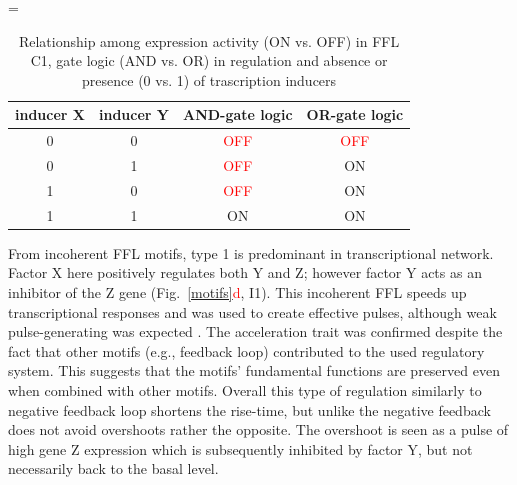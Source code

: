
\begin{center}
\LTcapwidth=\textwidth
    \begin{longtable}[c]{|c|c|c|c|}
\caption{Relationship among expression activity (ON vs. OFF) in FFL C1, gate logic (AND vs. OR) in regulation and absence or presence (0 vs. 1) of trascription inducers} \label{ANDvsOR} \\

\toprule \multicolumn{1}{|c|}{\textbf{inducer X}} & \multicolumn{1}{c|}{\textbf{inducer Y}}  & \multicolumn{1}{c|}{\textbf{AND-gate logic}} & \multicolumn{1}{c|}{\textbf{OR-gate logic}} \\
\midrule
\endhead

\bottomrule
\endlastfoot

0 & 0 & \textcolor{red}{OFF} & \textcolor{red}{OFF} \\
\hline
0 & 1 & \textcolor{red}{OFF} & \textcolor{mygreen}{ON} \\
\hline
1 & 0 & \textcolor{red}{OFF} & \textcolor{mygreen}{ON} \\
\hline
1 & 1 & \textcolor{mygreen}{ON} & \textcolor{mygreen}{ON} \\
    \end{longtable}
\end{center}


From incoherent FFL motifs, type 1 is predominant in  transcriptional network.
Factor X here positively regulates both Y and Z; however factor Y acts as an inhibitor of the Z gene (Fig.~\ref{motifs}\textcolor{red}{d}, I1).
This incoherent FFL speeds up transcriptional responses and was used to create effective pulses, although weak pulse-generating was expected \cite{mangan2003structure, basu2004spatiotemporal, mangan2006incoherent}.
The acceleration trait was confirmed despite the fact that other motifs (e.g., feedback loop) contributed to the used regulatory system.
This suggests that the motifs' fundamental functions are preserved even when combined with other motifs.
Overall this type of regulation similarly to negative feedback loop shortens the rise-time, but unlike the negative feedback does not avoid overshoots rather the opposite.
The overshoot is seen as a pulse of high gene Z expression which is subsequently inhibited by factor Y, but not necessarily back to the basal level.


